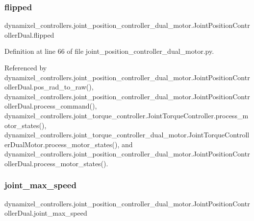 \subsubsection{\texorpdfstring{flipped}{flipped}}
{\footnotesize\ttfamily dynamixel\+\_\+controllers.\+joint\+\_\+position\+\_\+controller\+\_\+dual\+\_\+motor.\+Joint\+Position\+Controller\+Dual.\+flipped}



Definition at line 66 of file joint\+\_\+position\+\_\+controller\+\_\+dual\+\_\+motor.\+py.



Referenced by dynamixel\+\_\+controllers.\+joint\+\_\+position\+\_\+controller\+\_\+dual\+\_\+motor.\+Joint\+Position\+Controller\+Dual.\+pos\+\_\+rad\+\_\+to\+\_\+raw(), dynamixel\+\_\+controllers.\+joint\+\_\+position\+\_\+controller\+\_\+dual\+\_\+motor.\+Joint\+Position\+Controller\+Dual.\+process\+\_\+command(), dynamixel\+\_\+controllers.\+joint\+\_\+torque\+\_\+controller.\+Joint\+Torque\+Controller.\+process\+\_\+motor\+\_\+states(), dynamixel\+\_\+controllers.\+joint\+\_\+torque\+\_\+controller\+\_\+dual\+\_\+motor.\+Joint\+Torque\+Controller\+Dual\+Motor.\+process\+\_\+motor\+\_\+states(), and dynamixel\+\_\+controllers.\+joint\+\_\+position\+\_\+controller\+\_\+dual\+\_\+motor.\+Joint\+Position\+Controller\+Dual.\+process\+\_\+motor\+\_\+states().

\mbox{\label{classdynamixel__controllers_1_1joint__position__controller__dual__motor_1_1_joint_position_controller_dual_ad27362c487157ced2e5f2cc64e44c82f}} 
\subsubsection{\texorpdfstring{joint\+\_\+max\+\_\+speed}{joint\_max\_speed}}
{\footnotesize\ttfamily dynamixel\+\_\+controllers.\+joint\+\_\+position\+\_\+controller\+\_\+dual\+\_\+motor.\+Joint\+Position\+Controller\+Dual.\+joint\+\_\+max\+\_\+speed}




